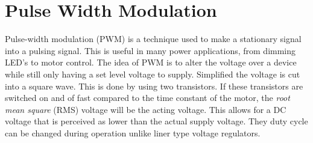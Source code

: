 \documentclass[a4paper,11pt]{kth-mag}
\begin{document}

\section{Pulse Width Modulation}

Pulse-width modulation (PWM) is a technique used to make a stationary signal into a pulsing signal.
This is useful in many power applications, from dimming LED's to motor control. The idea of 
PWM is to alter the voltage over a device while still only having a set level voltage to supply. Simplified  
the voltage is cut into a square wave. This is done by using two transistors\cite{elektro}. If these transistors are switched on and of fast 
compared to the time constant of the motor, the \textit{root mean square} (RMS) voltage will be the acting voltage.
This allows for a DC voltage that is perceived as lower than the actual supply voltage.
They duty cycle can be changed during operation unlike liner type voltage regulators.
\end{document}
